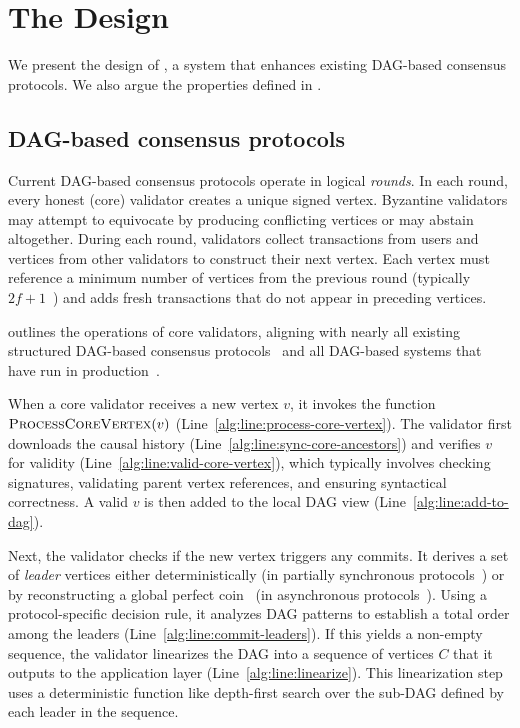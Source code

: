 \section{The \sysname Design} \label{sec:design}

We present the design of \sysname, a system that enhances existing DAG-based consensus protocols. We also argue the properties defined in .

\subsection{DAG-based consensus protocols} \label{sec:dag}

Current DAG-based consensus protocols operate in logical \emph{rounds}. In each round, every honest (core) validator creates a unique signed vertex. Byzantine validators may attempt to equivocate by producing conflicting vertices or may abstain altogether. During each round, validators collect transactions from users and vertices from other validators to construct their next vertex. Each vertex must reference a minimum number of vertices from the previous round (typically $2f + 1$~\cite{narwhal,bullshark,mysticeti}) and adds fresh transactions that do not appear in preceding vertices.

 outlines the operations of core validators, aligning with nearly all existing structured DAG-based consensus protocols~\cite{narwhal,bullshark,shoal,shoal++,mysticeti,dag-rider,dumbo-ng,dispersedledger,sailfish,bbca-chain,fino,gradeddag,cordial-miners,wahoo,lightdag} and all DAG-based systems that have run in production~\cite{narwhal,bullshark,mysticeti,hammerhead}.

When a core validator receives a new vertex $v$, it invokes the function $\Call{ProcessCoreVertex}{v}$ (Line~\ref{alg:line:process-core-vertex}). The validator first downloads the causal history (Line~\ref{alg:line:sync-core-ancestors}) and verifies $v$ for validity (Line~\ref{alg:line:valid-core-vertex}), which typically involves checking signatures, validating parent vertex references, and ensuring syntactical correctness. A valid $v$ is then added to the local DAG view (Line~\ref{alg:line:add-to-dag}).

Next, the validator checks if the new vertex triggers any commits. It derives a set of \emph{leader} vertices either deterministically (in partially synchronous protocols~\cite{bullshark,shoal,mysticeti}) or by reconstructing a global perfect coin~\cite{abraham2023bingo} (in asynchronous protocols~\cite{narwhal,cordial-miners}). Using a protocol-specific decision rule, it analyzes DAG patterns to establish a total order among the leaders (Line~\ref{alg:line:commit-leaders}). If this yields a non-empty sequence, the validator linearizes the DAG into a sequence of vertices $C$ that it outputs to the application layer (Line~\ref{alg:line:linearize}). This linearization step uses a deterministic function like depth-first search over the sub-DAG defined by each leader in the sequence.

